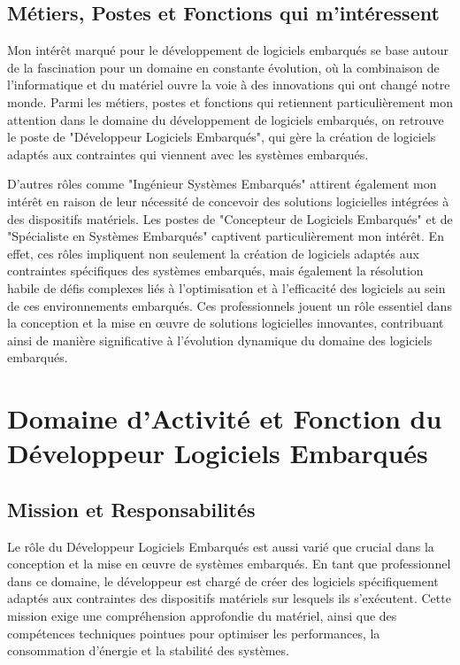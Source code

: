 \documentclass[a4paper,12pt]{report}
\begin{document}
\subsection*{Métiers, Postes et Fonctions qui m'intéressent}
Mon intérêt marqué pour le développement de logiciels embarqués se base autour de la fascination pour un domaine en constante évolution, où la combinaison de l'informatique et du matériel ouvre la voie à des innovations qui ont changé notre monde. Parmi les métiers, postes et fonctions qui retiennent particulièrement mon attention dans le domaine du développement de logiciels embarqués, on retrouve le poste de "Développeur Logiciels Embarqués", qui gère la création de logiciels adaptés aux contraintes qui viennent avec les systèmes embarqués.

D'autres rôles comme "Ingénieur Systèmes Embarqués" attirent également mon intérêt en raison de leur nécessité de concevoir des solutions logicielles intégrées à des dispositifs matériels. Les postes de "Concepteur de Logiciels Embarqués" et de "Spécialiste en Systèmes Embarqués" captivent particulièrement mon intérêt. En effet, ces rôles impliquent non seulement la création de logiciels adaptés aux contraintes spécifiques des systèmes embarqués, mais également la résolution habile de défis complexes liés à l'optimisation et à l'efficacité des logiciels au sein de ces environnements embarqués. Ces professionnels jouent un rôle essentiel dans la conception et la mise en œuvre de solutions logicielles innovantes, contribuant ainsi de manière significative à l'évolution dynamique du domaine des logiciels embarqués.

\section{Domaine d'Activité et Fonction du Développeur Logiciels Embarqués}

\subsection{Mission et Responsabilités}

Le rôle du Développeur Logiciels Embarqués est aussi varié que crucial dans la conception et la mise en œuvre de systèmes embarqués. En tant que professionnel dans ce domaine, le développeur est chargé de créer des logiciels spécifiquement adaptés aux contraintes des dispositifs matériels sur lesquels ils s'exécutent. Cette mission exige une compréhension approfondie du matériel, ainsi que des compétences techniques pointues pour optimiser les performances, la consommation d'énergie et la stabilité des systèmes.
\end{document}
